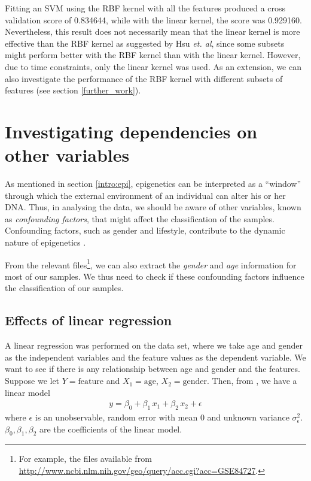 \documentclass[12pt, twoside, a4paper]{report}
\begin{document}

Fitting an SVM using the RBF kernel with all the features produced a cross validation score of 0.834644, while with the linear kernel, the score was 0.929160. Nevertheless, this result does not necessarily mean that the linear kernel is more effective than the RBF kernel as suggested by Hsu \textit{et. al}, since some subsets might perform better with the RBF kernel than with the linear kernel. However, due to time constraints, only the linear kernel was used. As an extension, we can also investigate the performance of the RBF kernel with different subsets of features (see section \ref{further_work}).

\section{Investigating dependencies on other variables}

As mentioned in section \ref{intro:epi}, epigenetics can be interpreted as a ``window'' through which the external environment of an individual can alter his or her DNA. Thus, in analysing the data, we should be aware of other variables, known as \textit{confounding factors}, that might affect the classification of the samples. Confounding factors, such as gender and lifestyle, contribute to the dynamic nature of epigenetics \cite{RefWorks:78}.

From the relevant files\footnote{For example, the files available from \url{http://www.ncbi.nlm.nih.gov/geo/query/acc.cgi?acc=GSE84727}.}, we can also extract the \textit{gender} and \textit{age} information for most of our samples. We thus need to check if these confounding factors influence the classification of our samples.

\subsection{Effects of linear regression}
A linear regression was performed on the data set, where we take age and gender as the independent variables and the feature values as the dependent variable. We want to see if there is any relationship between age and gender and the features. Suppose we let $Y=\text{feature}$ and $X_1=\text{age}$, $X_2=\text{gender}$. Then, from \cite{RefWorks:219}, we have a linear model
\begin{align*}
y = \beta_0 + \beta_1 \, x_1 + \beta_2 \, x_2 + \epsilon
\end{align*}
where $\epsilon$ is an unobservable, random error with mean 0 and unknown variance $\sigma_\epsilon^2$. $\beta_0, \beta_1, \beta_2$ are the coefficients of the linear model.
\end{document}
